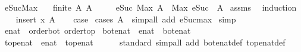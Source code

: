 \begin{isabellebody}
\endisatagproof
{\isafoldproof}%
%
\isadelimproof
\isanewline
%
\endisadelimproof
\isanewline
{}\isamarkupfalse%
\ eSuc{\isacharunderscore}Max{\isacharcolon}\isanewline
\ \ \ {\isachardoublequoteopen}finite\ A{\isachardoublequoteclose}\ {\isachardoublequoteopen}A\ {\isasymnoteq}\ {\isacharbraceleft}{\isacharbraceright}{\isachardoublequoteclose}\isanewline
\ \ \ {\isachardoublequoteopen}eSuc\ {\isacharparenleft}Max\ A{\isacharparenright}\ {\isacharequal}\ Max\ {\isacharparenleft}eSuc\ {\isacharbackquote}\ A{\isacharparenright}{\isachardoublequoteclose}\isanewline
%
\isadelimproof
%
\endisadelimproof
%
\isatagproof
{}\isamarkupfalse%
\ assms\ \isamarkupfalse%
\ induction\isanewline
\ \ \isamarkupfalse%
\ {\isacharparenleft}insert\ x\ A{\isacharparenright}\isanewline
\ \ \isamarkupfalse%
\ {\isacharquery}case\ \isamarkupfalse%
{\isacharparenleft}cases\ {\isachardoublequoteopen}A\ {\isacharequal}\ {\isacharbraceleft}{\isacharbraceright}{\isachardoublequoteclose}{\isacharparenright}{\isacharparenleft}simp{\isacharunderscore}all\ add{\isacharcolon}\ eSuc{\isacharunderscore}max{\isacharparenright}\isanewline
{}\isamarkupfalse%
\ simp%
\endisatagproof
{\isafoldproof}%
%
\isadelimproof
\isanewline
%
\endisadelimproof
\isanewline
{}\isamarkupfalse%
\ enat\ {\isacharcolon}{\isacharcolon}\ {\isachardoublequoteopen}{\isacharbraceleft}order{\isacharunderscore}bot{\isacharcomma}\ order{\isacharunderscore}top{\isacharbraceright}{\isachardoublequoteclose}\isanewline
{}\isanewline
\isanewline
{}\isamarkupfalse%
\ bot{\isacharunderscore}enat\ {\isacharcolon}{\isacharcolon}\ enat\ \ {\isachardoublequoteopen}bot{\isacharunderscore}enat\ {\isacharequal}\ {}{\isachardoublequoteclose}\isanewline
{}\isamarkupfalse%
\ top{\isacharunderscore}enat\ {\isacharcolon}{\isacharcolon}\ enat\ \ {\isachardoublequoteopen}top{\isacharunderscore}enat\ {\isacharequal}\ {\isasyminfinity}{\isachardoublequoteclose}\isanewline
\isanewline
{}\isamarkupfalse%
\isanewline
%
\isadelimproof
\ \ %
\endisadelimproof
%
\isatagproof
{}\isamarkupfalse%
\ standard\ {\isacharparenleft}simp{\isacharunderscore}all\ add{\isacharcolon}\ bot{\isacharunderscore}enat{\isacharunderscore}def\ top{\isacharunderscore}enat{\isacharunderscore}def{\isacharparenright}%
\endisatagproof
{\isafoldproof}%
%
\isadelimproof

\end{isabellebody}
